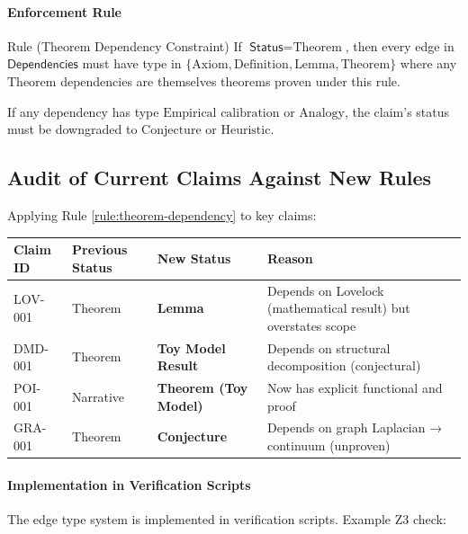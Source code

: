 \documentclass[11pt,titlepage]{article}
\begin{document}
\paragraph{Enforcement Rule}
\begin{mytheorem}{Rule (Theorem Dependency Constraint)}
\label{rule:theorem-dependency}
If $\textsf{Status} = \text{Theorem}$, then every edge in $\textsf{Dependencies}$ must have type in $\{\text{Axiom}, \text{Definition}, \text{Lemma}, \text{Theorem}\}$ where any $\text{Theorem}$ dependencies are themselves theorems proven under this rule.

If any dependency has type $\text{Empirical calibration}$ or $\text{Analogy}$, the claim's status must be downgraded to $\text{Conjecture}$ or $\text{Heuristic}$.
\end{mytheorem}

\subsection{Audit of Current Claims Against New Rules}

Applying Rule \ref{rule:theorem-dependency} to key claims:

\begin{tcolorbox}[colback=yellow!5!white,colframe=yellow!75!black,title=Audit Results]
\begin{tabular}{p{}p{}p{}p{}}
\textbf{Claim ID} & \textbf{Previous Status} & \textbf{New Status} & \textbf{Reason} \\ \hline
LOV-001 & Theorem & \textbf{Lemma} & Depends on Lovelock (mathematical result) but overstates scope \\
DMD-001 & Theorem & \textbf{Toy Model Result} & Depends on structural decomposition (conjectural) \\
POI-001 & Narrative & \textbf{Theorem (Toy Model)} & Now has explicit functional and proof \\
GRA-001 & Theorem & \textbf{Conjecture} & Depends on graph Laplacian → continuum (unproven) \\
\end{tabular}
\end{tcolorbox}

\paragraph{Implementation in Verification Scripts}
The edge type system is implemented in verification scripts. Example Z3 check:
\end{document}

